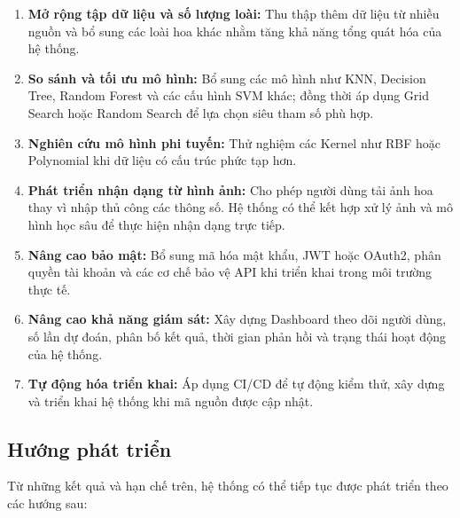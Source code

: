 \documentclass[14pt]{extarticle}
\begin{document}
\begin{enumerate}[leftmargin=*]
	
	\item \textbf{Mở rộng tập dữ liệu và số lượng loài:} Thu thập thêm dữ liệu từ nhiều nguồn và bổ sung các loài hoa khác nhằm tăng khả năng tổng quát hóa của hệ thống.
	
	\item \textbf{So sánh và tối ưu mô hình:} Bổ sung các mô hình như KNN, Decision Tree, Random Forest và các cấu hình SVM khác; đồng thời áp dụng Grid Search hoặc Random Search để lựa chọn siêu tham số phù hợp.
	
	\item \textbf{Nghiên cứu mô hình phi tuyến:} Thử nghiệm các Kernel như RBF hoặc Polynomial khi dữ liệu có cấu trúc phức tạp hơn.
	
	\item \textbf{Phát triển nhận dạng từ hình ảnh:} Cho phép người dùng tải ảnh hoa thay vì nhập thủ công các thông số. Hệ thống có thể kết hợp xử lý ảnh và mô hình học sâu để thực hiện nhận dạng trực tiếp.
	
	\item \textbf{Nâng cao bảo mật:} Bổ sung mã hóa mật khẩu, JWT hoặc OAuth2, phân quyền tài khoản và các cơ chế bảo vệ API khi triển khai trong môi trường thực tế.
	
	\item \textbf{Nâng cao khả năng giám sát:} Xây dựng Dashboard theo dõi người dùng, số lần dự đoán, phân bố kết quả, thời gian phản hồi và trạng thái hoạt động của hệ thống.
	
	\item \textbf{Tự động hóa triển khai:} Áp dụng CI/CD để tự động kiểm thử, xây dựng và triển khai hệ thống khi mã nguồn được cập nhật.
	
\end{enumerate}


	
	\subsection{Hướng phát triển}
	
	\noindent Từ những kết quả và hạn chế trên, hệ thống có thể tiếp tục được phát triển theo các hướng sau:
	
\end{document}
